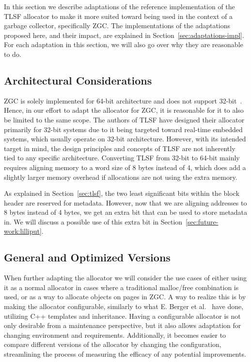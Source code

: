 In this section we describe adaptations of the reference implementation of the TLSF allocator to make it more suited toward being used in the context of a garbage collector, specifically ZGC. The implementations of the adaptations proposed here, and their impact, are explained in Section~\ref{sec:adaptations-impl}. For each adaptation in this section, we will also go over why they are reasonable to do.

\subsection{Architectural Considerations}
\label{sec:adaptations:architectural-considerations}

ZGC is solely implemented for 64-bit architecture and does not support 32-bit~\cite{zgc_deep_dive}. Hence, in our effort to adapt the allocator for ZGC, it is reasonable for it to also be limited to the same scope. The authors of TLSF have designed their allocator primarily for 32-bit systems due to it being targeted toward real-time embedded systems, which usually operate on 32-bit architecture. However, with its intended target in mind, the design principles and concepts of TLSF are not inherently tied to any specific architecture. Converting TLSF from 32-bit to 64-bit mainly requires aligning memory to a word size of 8 bytes instead of 4, which does add a slightly larger memory overhead if allocations are not using the extra memory.

As explained in Section~\ref{sec:tlsf}, the two least significant bits within the block header are reserved for metadata. However, now that we are aligning addresses to 8 bytes instead of 4 bytes, we get an extra bit that can be used to store metadata in. We will discuss a possible use of this extra bit in Section~\ref{sec:future-work:lilliput}.

\subsection{General and Optimized Versions}

When further adapting the allocator we will consider the use cases of either using it as a normal allocator in cases where a traditional malloc/free combination is used, or as a way to allocate objects on pages in ZGC. A way to realize this is by making the allocator configurable, similarly to what E. Berger et al.~\cite{configurable_allocator} have done, utilizing C++ templates and inheritance. Having a configurable allocator is not only desirable from a maintenance perspective, but it also allows adaptation for changing environment and requirements. Additionally, it becomes easier to compare different versions of the allocator by changing the configuration, streamlining the process of measuring the efficacy of any potential improvements.

